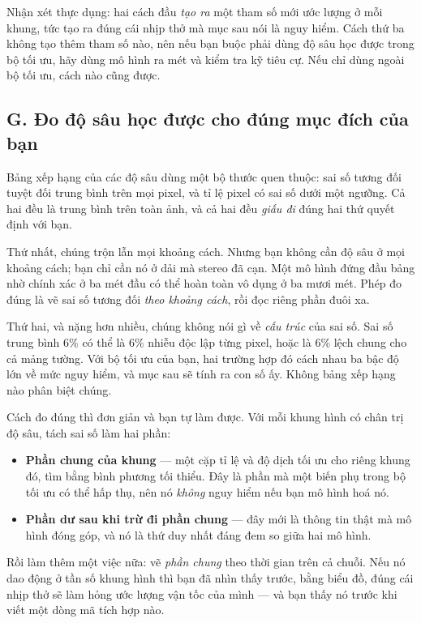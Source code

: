 \documentclass[../../deep_learning.tex]{subfiles}
\begin{document}
Nhận xét thực dụng: hai cách đầu \emph{tạo ra} một tham số mới ước lượng ở mỗi khung, tức tạo ra đúng cái nhịp thở mà mục sau nói là nguy hiểm. Cách thứ ba không tạo thêm tham số nào, nên nếu bạn buộc phải dùng độ sâu học được trong bộ tối ưu, hãy dùng mô hình ra mét và kiểm tra kỹ tiêu cự. Nếu chỉ dùng ngoài bộ tối ưu, cách nào cũng được.

\subsection{G. Đo độ sâu học được cho đúng mục đích của bạn}
Bảng xếp hạng của các  độ sâu dùng một bộ thước quen thuộc: sai số tương đối tuyệt đối trung bình trên mọi pixel, và tỉ lệ pixel có sai số dưới một ngưỡng. Cả hai đều là trung bình trên toàn ảnh, và cả hai đều \emph{giấu đi} đúng hai thứ quyết định với bạn.

Thứ nhất, chúng trộn lẫn mọi khoảng cách. Nhưng bạn không cần độ sâu ở mọi khoảng cách; bạn chỉ cần nó ở dải mà stereo đã cạn. Một mô hình đứng đầu bảng nhờ chính xác ở ba mét đầu có thể hoàn toàn vô dụng ở ba mươi mét. Phép đo đúng là vẽ sai số tương đối \emph{theo khoảng cách}, rồi đọc riêng phần đuôi xa.

Thứ hai, và nặng hơn nhiều, chúng không nói gì về \emph{cấu trúc} của sai số. Sai số trung bình 6\% có thể là 6\% nhiễu độc lập từng pixel, hoặc là 6\% lệch chung cho cả mảng tường. Với bộ tối ưu của bạn, hai trường hợp đó cách nhau ba bậc độ lớn về mức nguy hiểm, và mục sau sẽ tính ra con số ấy. Không bảng xếp hạng nào phân biệt chúng.

Cách đo đúng thì đơn giản và bạn tự làm được. Với mỗi khung hình có chân trị độ sâu, tách sai số làm hai phần:
\begin{itemize}
\item \textbf{Phần chung của khung} --- một cặp tỉ lệ và độ dịch tối ưu cho riêng khung đó, tìm bằng bình phương tối thiểu. Đây là phần mà một biến phụ trong bộ tối ưu có thể hấp thụ, nên nó \emph{không} nguy hiểm nếu bạn mô hình hoá nó.
\item \textbf{Phần dư sau khi trừ đi phần chung} --- đây mới là thông tin thật mà mô hình đóng góp, và nó là thứ duy nhất đáng đem so giữa hai mô hình.
\end{itemize}
Rồi làm thêm một việc nữa: vẽ \emph{phần chung} theo thời gian trên cả chuỗi. Nếu nó dao động ở tần số khung hình thì bạn đã nhìn thấy trước, bằng biểu đồ, đúng cái nhịp thở sẽ làm hỏng ước lượng vận tốc của mình --- và bạn thấy nó trước khi viết một dòng mã tích hợp nào.
\end{document}
